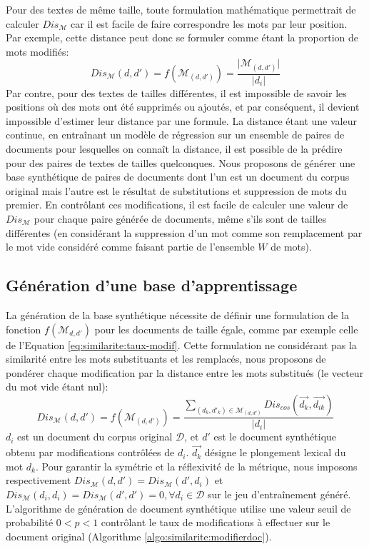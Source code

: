 Pour des textes de même taille, toute formulation mathématique permettrait de calculer $Dis_\mathcal{M}$ car il est facile de faire correspondre les mots par leur position. Par exemple, cette distance peut donc se formuler comme étant la proportion de mots modifiés:
\begin{equation}
{Dis_\mathcal{M}}(d,d') = {f}(\mathcal{M}_{(d,d')}) = \frac{\vert \mathcal{M}_{(d,d')} \vert}{\vert d_i \vert } \label{eq:similarite:taux-modif}
\end{equation}
 Par contre, pour des textes de tailles différentes, il est impossible de savoir les positions où des mots ont été supprimés ou ajoutés, et par conséquent, il devient impossible d'estimer leur distance par une formule. La distance étant une valeur continue, en entraînant un modèle de régression sur un ensemble de paires de documents pour lesquelles on connaît la distance, il est possible de la prédire pour des paires de textes de tailles quelconques. Nous proposons de générer une base synthétique de paires de documents dont l'un est un document du corpus original mais l'autre est le résultat de substitutions et suppression de mots du premier. En contrôlant ces modifications, il est facile de calculer une valeur de $Dis_\mathcal{M}$ pour chaque paire générée de documents, même s'ils sont de tailles différentes (en considérant la suppression d'un mot comme son remplacement par le \og mot vide \fg{} considéré comme faisant partie de l'ensemble $W$ de mots).

\subsection{Génération d'une base d'apprentissage}
La génération de la base synthétique nécessite de définir une formulation de la fonction $f(\mathcal{M}_{d, d'})$ pour les documents de taille égale, comme par exemple celle de l'Equation \ref{eq:similarite:taux-modif}. Cette formulation ne considérant pas la similarité entre les mots substituants et les remplacés, nous proposons de pondérer chaque modification par la distance entre les mots substitués (le vecteur du  \og mot vide \fg{} étant nul):
\begin{equation}
{Dis_\mathcal{M}}(d,d') = {f}(\mathcal{M}_{(d,d')}) = \frac{\sum\limits_{(d_k, d'_k) \in \mathcal{M}_{(d,d')}} Dis_{cos}(\vec{d_k}, \vec{d_{ik}})}{\vert d_i \vert} \label{eq:similarite:somme-dist-mots}
\end{equation}
$d_i$ est un document du corpus original $\mathcal{D}$, et $d'$ est le document synthétique obtenu par modifications contrôlées de $d_i$. $\vec{d_k}$ désigne le plongement lexical du mot $d_k$. Pour garantir la symétrie et la réflexivité de la métrique, nous imposons respectivement ${Dis_\mathcal{M}}(d,d') = {Dis_\mathcal{M}}(d', d_i)$ et ${Dis_\mathcal{M}}(d_i, d_i) = {Dis_\mathcal{M}}(d', d') = 0, \forall d_i \in \mathcal{D}$ sur le jeu d'entraînement généré. L'algorithme de génération de document synthétique utilise une valeur seuil de probabilité $0<p<1$ contrôlant le taux de modifications à effectuer sur le document original (Algorithme \ref{algo:similarite:modifierdoc}). 

